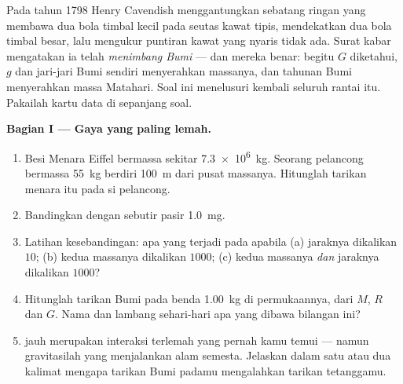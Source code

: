 \begin{problem}
\label{pb:g10:universal-gravitation:1}
Pada tahun 1798 Henry Cavendish menggantungkan sebatang ringan yang
membawa dua bola timbal kecil pada seutas kawat tipis, mendekatkan dua
bola timbal besar, lalu mengukur puntiran kawat yang nyaris tidak ada.
Surat kabar mengatakan ia telah \emph{menimbang Bumi} --- dan mereka
benar: begitu $G$ diketahui, $g$ dan jari-jari Bumi sendiri menyerahkan
massanya, dan  tahunan Bumi menyerahkan massa Matahari. Soal ini
menelusuri kembali seluruh rantai itu. Pakailah kartu data di sepanjang
soal.

\medskip
\noindent\textbf{Bagian I --- Gaya yang paling lemah.}
\begin{enumerate}
  \item Besi Menara Eiffel bermassa sekitar \qty{7.3e6}{kg}. Seorang
        pelancong bermassa \qty{55}{kg} berdiri \qty{100}{m} dari pusat
        massanya. Hitunglah tarikan menara itu pada si pelancong.
  \item Bandingkan dengan  sebutir pasir \qty{1.0}{mg}.
  \item Latihan kesebandingan: apa yang terjadi pada 
        apabila (a) jaraknya dikalikan $10$; (b) kedua massanya
        dikalikan $1000$; (c) kedua massanya \emph{dan} jaraknya
        dikalikan $1000$?
  \item Hitunglah tarikan Bumi pada benda \qty{1.00}{kg} di
        permukaannya, dari $M$, $R$ dan $G$. Nama dan lambang
        sehari-hari apa yang dibawa bilangan ini?
  \item {} jauh merupakan interaksi terlemah yang pernah kamu
        temui --- namun gravitasilah yang menjalankan alam semesta.
        Jelaskan dalam satu atau dua kalimat mengapa tarikan Bumi
        padamu mengalahkan tarikan tetanggamu.
\end{enumerate}


\end{problem}
